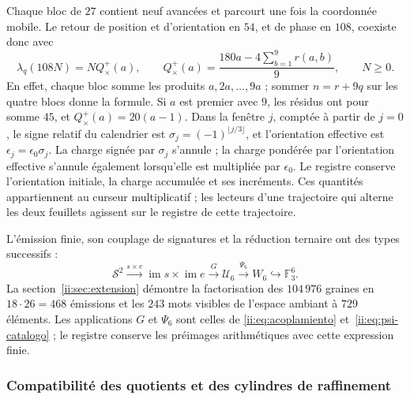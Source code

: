 Chaque bloc de \(27\) contient neuf avancées et parcourt une fois
la coordonnée mobile. Le retour de position et d'orientation
en \(54\), et de phase en \(108\), coexiste donc avec
\begin{equation}
 \lambda_q(108N)=NQ_\times^+(a),\qquad
 Q_\times^+(a)=\frac{180a-4\sum_{b=1}^9r(a,b)}9,
 \qquad N\geq0.
 \label{ii:prd-arit:retorno}
\end{equation}
En effet, chaque bloc somme les produits \(a,2a,\ldots,9a\) ;
sommer \(n=r+9q\) sur les quatre blocs donne la formule. Si
\(a\) est premier avec \(9\), les résidus ont pour somme \(45\), et
\(Q_\times^+(a)=20(a-1)\). Dans la fenêtre \(j\), comptée à partir de
\(j=0\), le signe relatif du calendrier est
\(\sigma_j=(-1)^{\lfloor j/3\rfloor}\), et l'orientation
effective est \(\epsilon_j=\epsilon_0\sigma_j\).
La charge signée par \(\sigma_j\) s'annule ; la charge pondérée
par l'orientation effective s'annule également lorsqu'elle est multipliée par
\(\epsilon_0\). Le registre conserve l'orientation initiale, la charge
accumulée et ses incréments. Ces quantités appartiennent
au curseur multiplicatif ; les lecteurs d'une trajectoire qui
alterne les deux feuillets agissent sur le registre de cette trajectoire.



L'émission finie, son couplage de signatures et la réduction ternaire ont des types successifs :
\[
 \mathcal S^2\xrightarrow{s\times e}
 \operatorname{im}s\times\operatorname{im}e
 \xrightarrow{G}\mathcal U_6
 \xrightarrow{\Psi_6}W_6\hookrightarrow\mathbb F_3^6.
\]
La section~\ref{ii:sec:extension} démontre la factorisation des \(104\,976\) graines en \(18\cdot26=468\) émissions et les \(243\) mots visibles de l’espace ambiant à \(729\) éléments. Les applications \(G\) et \(\Psi_6\) sont celles de \eqref{ii:eq:acoplamiento} et~\eqref{ii:eq:psi-catalogo} ; le registre conserve les préimages arithmétiques avec cette expression finie.

\subsubsection{Compatibilité des quotients et des cylindres de raffinement}

